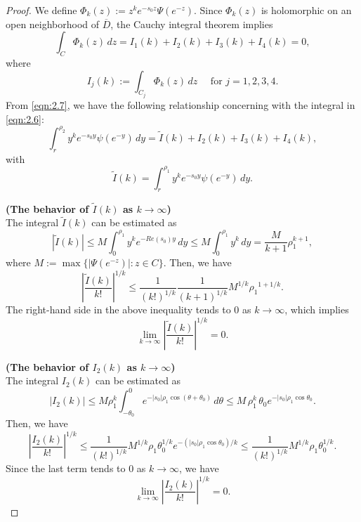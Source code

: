 \documentclass[10pt,a4paper]{amsart}
\numberwithin{equation}{section}
\newcommand{\1}{{\bf 1}}
\begin{document}
\begin{proof}


We define $\Phi_k(z):=z^k e^{-s_0z}\Psi(e^{-z})$.
Since $\Phi_k(z)$ is holomorphic on an open 
neighborhood of $\overline{D}$,
the Cauchy integral theorem implies
\begin{equation}\label{eqn:2.7}
\int_C \Phi_k(z)\,dz
=I_1(k)+I_2(k)+I_3(k)+I_4(k) %
=0,
\end{equation}
where 
$$
I_j(k):=\int_{C_j}\Phi_k(z)\,dz \quad 
\text{ for } j=1,2,3,4.
$$ 
From \eqref{eqn:2.7},
we have the following relationship concerning with 
the integral in \eqref{eqn:2.6}:
\begin{equation}\label{eqn:2.8}
\int_r^{\rho_2} 
y^k e^{-s_0y}\psi(e^{-y})\,dy
=\tilde{I}(k)+I_2(k)+I_3(k)+I_4(k),
\end{equation}
with
\begin{equation*}
\tilde{I}(k)=
\int_r^{\rho_1} y^k e^{-s_0y}\psi(e^{-y})\,dy.
\end{equation*}

{\bf (The behavior of $\tilde{I}(k)$ as $k\to\infty$)} \\
The integral $\tilde{I}(k)$ can be estimated as
\begin{equation*}
\left|\tilde{I}(k)\right|
\le M\int_0^{\rho_1} y^k e^{-{Re}(s_0)y}\,dy 
\le M\int_0^{\rho_1} y^k\,dy
=\frac{M}{k+1}\rho_1^{k+1},
\end{equation*}
where $M:=\max\{|\Psi(e^{-z})|:z\in C\}$.
Then,
we have
\begin{equation*}\label{eqn:2.}
\left|\frac{\tilde{I}(k)}{k!} \right|^{1/k} 
\le \frac{1}{(k!)^{1/k}}\frac{1}{(k+1)^{1/k}} 
M^{1/k}  {\rho_1}^{1+1/k}.
\end{equation*}
The right-hand side in the above 
inequality  tends to $0$ as $k \to \infty$,
which implies
\begin{equation}\label{eqn:2.9}
\lim_{k\to \infty}\left|\frac{\tilde{I}(k)}{k!}\right|^{1/k}
=0.
\end{equation}

{\bf (The behavior of $I_2(k)$ as $k\to\infty$)} \\
The integral $I_2(k)$ can be estimated as
\begin{equation*}
|I_2(k)|
\le M \rho_1^k
\int_{-\theta_0}^0 
e^{-|s_0|\rho_1 \cos(\theta+\theta_0)}\,d\theta
\le M \, \rho_1^k \, 
\theta_0 e^{-|s_0|\rho_1 \cos\theta_0}.
\end{equation*}
Then,
we have
\begin{equation*}
\left|\frac{I_2(k)}{k!} \right|^{1/k} 
\le \frac{1}{(k!)^{1/k}} M^{1/k} \rho_1 
\theta_0^{1/k} e^{-(|s_0|\rho_1 \cos\theta_0)/k}
\le \frac{1}{(k!)^{1/k}} M^{1/k}\rho_1 \theta_0^{1/k}.
\end{equation*}
Since the last term tends to $0$ as $k \to \infty$,
we have
\begin{equation}\label{eqn:2.10}
\lim_{k\to\infty}\left|\frac{I_2(k)}{k!}\right|^{1/k}=0.
\end{equation}


\end{proof}
\end{document}
